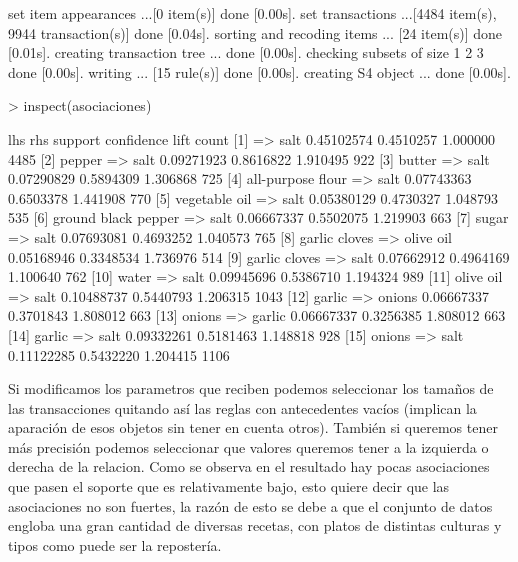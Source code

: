 \documentclass [a4paper] {article}
\begin{document}
\begin{Schunk}
\begin{Soutput}
set item appearances ...[0 item(s)] done [0.00s].
set transactions ...[4484 item(s), 9944 transaction(s)] done [0.04s].
sorting and recoding items ... [24 item(s)] done [0.01s].
creating transaction tree ... done [0.00s].
checking subsets of size 1 2 3 done [0.00s].
writing ... [15 rule(s)] done [0.00s].
creating S4 object  ... done [0.00s].
\end{Soutput}
\begin{Sinput}
> inspect(asociaciones)
\end{Sinput}
\begin{Soutput}
     lhs                      rhs         support    confidence lift     count
[1]  {}                    => {salt}      0.45102574 0.4510257  1.000000 4485 
[2]  {pepper}              => {salt}      0.09271923 0.8616822  1.910495  922 
[3]  {butter}              => {salt}      0.07290829 0.5894309  1.306868  725 
[4]  {all-purpose flour}   => {salt}      0.07743363 0.6503378  1.441908  770 
[5]  {vegetable oil}       => {salt}      0.05380129 0.4730327  1.048793  535 
[6]  {ground black pepper} => {salt}      0.06667337 0.5502075  1.219903  663 
[7]  {sugar}               => {salt}      0.07693081 0.4693252  1.040573  765 
[8]  {garlic cloves}       => {olive oil} 0.05168946 0.3348534  1.736976  514 
[9]  {garlic cloves}       => {salt}      0.07662912 0.4964169  1.100640  762 
[10] {water}               => {salt}      0.09945696 0.5386710  1.194324  989 
[11] {olive oil}           => {salt}      0.10488737 0.5440793  1.206315 1043 
[12] {garlic}              => {onions}    0.06667337 0.3701843  1.808012  663 
[13] {onions}              => {garlic}    0.06667337 0.3256385  1.808012  663 
[14] {garlic}              => {salt}      0.09332261 0.5181463  1.148818  928 
[15] {onions}              => {salt}      0.11122285 0.5432220  1.204415 1106 
\end{Soutput}
\end{Schunk}
Si modificamos los parametros que reciben podemos seleccionar los tamaños de las transacciones quitando así las reglas con antecedentes vacíos (implican la aparación de esos objetos sin tener en cuenta otros).
También si queremos tener más precisión podemos seleccionar que valores queremos tener a la izquierda o derecha de la relacion. Como se observa en
el resultado hay pocas asociaciones que pasen el soporte que es relativamente bajo, esto quiere decir que las asociaciones no son fuertes, la razón de esto 
se debe a que el conjunto de datos engloba una gran cantidad de diversas recetas, con platos de distintas culturas y tipos como puede ser la repostería.
\end{document}
